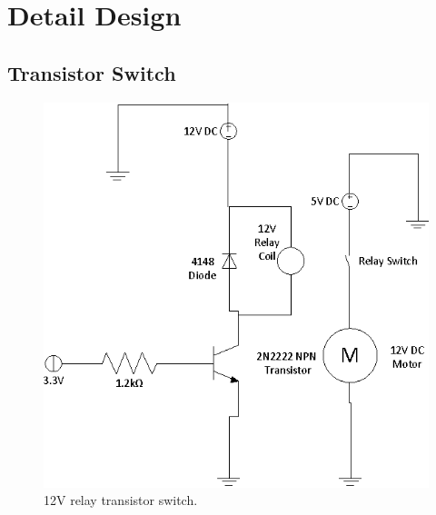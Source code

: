 \chapter{Detail Design}

\section{Transistor Switch}

\begin{figure}[h]
\centering
\includegraphics[scale=0.7]{relay_switch.eps}
\caption{12V relay transistor switch. }
\end{figure}
